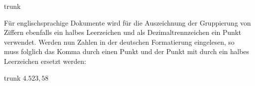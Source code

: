 \documentclass[%
  english,ngerman,%
  headings=small,%
]{tudscrartcl}
\begin{document}
\begin{Entity}{}
\begin{Code}[input]{trunk}
\end{Code}

Für englischsprachige Dokumente wird für die Auszeichnung der Gruppierung von 
Ziffern ebenfalls ein halbes Leerzeichen und als Dezimaltrennzeichen ein Punkt 
verwendet. Werden nun Zahlen in der deutschen Formatierung eingelesen, so muss 
folglich das Komma durch einen Punkt  und der 
Punkt mit  durch ein halbes Leerzeichen 
ersetzt werden:%
%
\begin{Code}[input]{trunk}
\begingroup
  \dotswap{\,}
  \(4.523,58\)
\endgroup
\end{Code}

\FinishTutorial
\ListOfToDo
\end{Entity}
\end{document}
